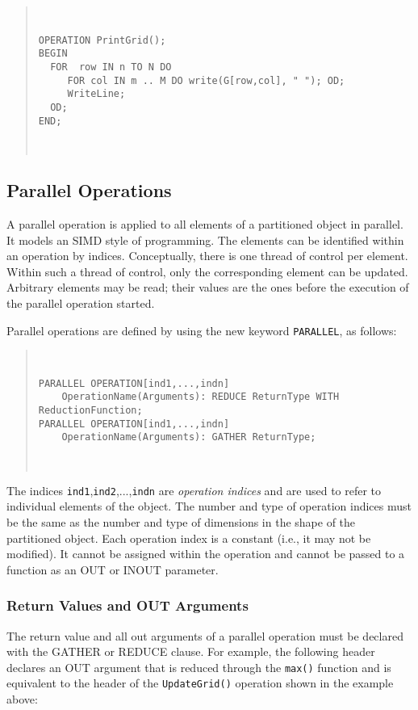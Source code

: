 \documentclass{article}
\newenvironment{example}
  {\begin{quote} ~\hrulefill }
  {~\hrulefill \end{quote} }
\begin{document}
\begin{example} \begin{verbatim}
OPERATION PrintGrid(); 
BEGIN 
  FOR  row IN n TO N DO 
     FOR col IN m .. M DO write(G[row,col], " "); OD; 
     WriteLine;
  OD; 
END; 
\end{verbatim} 
\end{example}

\subsection{Parallel Operations}

A parallel operation is applied to all elements of a partitioned
object in parallel. It models an SIMD style of programming. The
elements can be identified within an operation by
indices. Conceptually, there is one thread of control per
element. Within such a thread of control, only the corresponding
element can be updated. Arbitrary elements may be read; their values
are the ones before the execution of the parallel operation started.

Parallel operations are defined by using the new keyword
\verb+PARALLEL+, as follows:

\begin{example} \begin{verbatim}
PARALLEL OPERATION[ind1,...,indn] 
    OperationName(Arguments): REDUCE ReturnType WITH ReductionFunction;
PARALLEL OPERATION[ind1,...,indn] 
    OperationName(Arguments): GATHER ReturnType;
\end{verbatim} 
\end{example}

The indices \verb+ind1+,\verb+ind2+,...,\verb+indn+ are {\em operation
indices} and are used to refer to individual elements of the
object. The number and type of operation indices must be the same as
the number and type of dimensions in the shape of the partitioned
object. Each operation index is a constant (i.e., it may not be
modified). It cannot be assigned within the operation and cannot be
passed to a function as an OUT or INOUT parameter.

\subsubsection*{Return Values and OUT Arguments}

The return value and all out arguments of a parallel operation must be
declared with the GATHER or REDUCE clause. For example, the following
header declares an OUT argument that is reduced through the
\verb+max()+ function and is equivalent to the header of the
\verb+UpdateGrid()+ operation shown in the example above:
\end{document}
